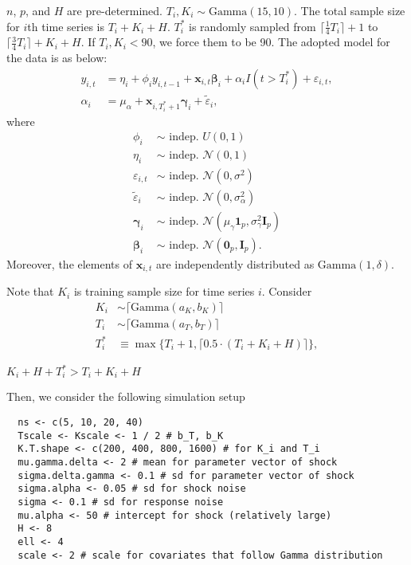 \documentclass[12pt]{article}
\def\mbf#1{\mathbf{#1}} %
\def\mrm#1{\mathrm{#1}} %
\def\mc#1{\mathcal{#1}} %
\def\mc#1{\mathcal{#1}}
\def\bs#1{\boldsymbol{#1}}
\newcommand{\ceil}[1]{\lceil #1 \rceil}
\theoremstyle{definition}
\theoremstyle{definition}
\begin{document}
$n$, $p$, and $H$ are pre-determined. $T_i, K_i \sim \mrm{Gamma}(15, 10)$.  The total sample size for $i$th time series is $T_i + K_i + H$. $T_i^*$ is randomly sampled from $\ceil{\frac{1}{4}T_i}+1$ to $\ceil{\frac{3}{4} T_i} + K_i+ H$. If $T_i, K_i < 90$, we force them to be 90. The adopted model for the data is as below:
\begin{align*}
  y_{i,t} &= \eta_i + \phi_i y_{i,t-1} + \mbf{x}_{i,t} \bs{\beta}_i + \alpha_i I(t > T_i^*) + \varepsilon_{i,t},\\
  \alpha_i &= \mu_{\alpha} + \mbf{x}_{i,T_i^*+1}\bs{\gamma}_i + \tilde{\varepsilon}_{i},
\end{align*}
where
\begin{align*}
  \phi_i & \sim \text{ indep. }  U(0,1) \\
  \eta_i & \sim \text{ indep. }  \mc{N}(0,1) \\
  \varepsilon_{i,t} & \sim \text{ indep. } \mc{N}(0, \sigma^2)\\
  \tilde{\varepsilon}_i & \sim \text{ indep. } \mc{N}(0, \sigma_{\alpha}^2)
  \\
  \bs{\gamma}_i & \sim \text{ indep. } \mc{N}(\mu_{\gamma}\bs{1}_p, \sigma_{\gamma}^2 \mbf{I}_p) \\
  \bs{\beta}_i & \sim \text{ indep. }  \mc{N}(\bs{0}_p, \mbf{I}_p).
\end{align*}
Moreover, the elements of $\mathbf{x}_{i,t}$ are independently distributed as $\mrm{Gamma}(1,\delta)$.

Note that $K_i$ is training sample size for time series $i$. Consider
\begin{align*}
  K_i & \sim \ceil{\mrm{Gamma}(a_{K}, b_K)}\\
   T_i & \sim \ceil{\mrm{Gamma}(a_{T}, b_T)} \\
  T_i^* &\equiv \max\{T_i+1, \ceil{0.5 \cdot(T_i+K_i+H)}\},
\end{align*}

$K_i+H+T_i^* > T_i+K_i+H$

 Then, we consider the following simulation setup
\begin{verbatim}
  ns <- c(5, 10, 20, 40)
  Tscale <- Kscale <- 1 / 2 # b_T, b_K 
  K.T.shape <- c(200, 400, 800, 1600) # for K_i and T_i
  mu.gamma.delta <- 2 # mean for parameter vector of shock
  sigma.delta.gamma <- 0.1 # sd for parameter vector of shock
  sigma.alpha <- 0.05 # sd for shock noise  
  sigma <- 0.1 # sd for response noise
  mu.alpha <- 50 # intercept for shock (relatively large)
  H <- 8 
  ell <- 4
  scale <- 2 # scale for covariates that follow Gamma distribution
\end{verbatim}
\end{document}
